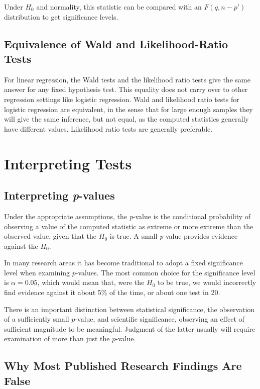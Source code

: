 \documentclass[14pt]{extarticle}
\begin{document}
Under \(H_0\) and normality, this statistic can be compared with an \(F(q, n - p')\) distribution to get significance levels.

\subsection*{Equivalence of Wald and Likelihood-Ratio Tests}

For linear regression, the Wald tests and the likelihood ratio tests give the same answer for any fixed hypothesis test. This equality does not carry over to other regression settings like logistic regression. 
Wald and likelihood ratio tests for logistic regression are equivalent, in the sense that for large enough samples they will give the same inference, but not equal, as the computed statistics generally have different values. Likelihood ratio tests are generally preferable.

\section*{Interpreting Tests}

\subsection*{Interpreting \textit{p}-values}

Under the appropriate assumptions, the \textit{p}-value is the conditional probability of observing a value of the computed statistic as extreme or more extreme than the observed value, given that the $H_0$ is true. 
A small \textit{p}-value provides evidence against the $H_0$.

In many research areas it has become traditional to adopt a fixed significance level when examining $p$-values. The most common choice for the significance level is $\alpha = 0.05$, which would mean that, were the $H_0$ to be true, we would incorrectly find evidence against it about 5\% of the time, or about one test in 20.

There is an important distinction between statistical significance, the observation of a sufficiently small $p$-value, and scientific significance, observing an effect of sufficient magnitude to be meaningful. Judgment of the latter usually will require examination of more than just the $p$-value.

\subsection*{Why Most Published Research Findings Are False}
\end{document}
